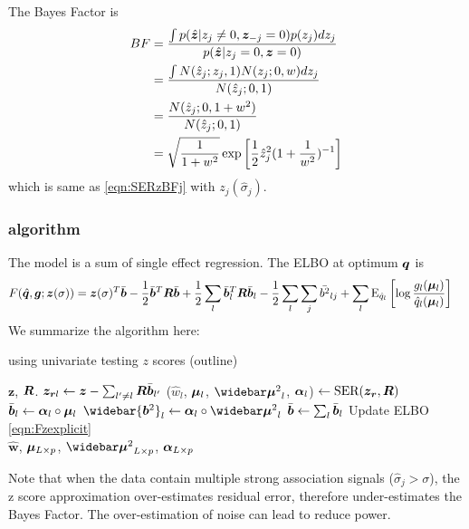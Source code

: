 The Bayes Factor is 
\begin{align}
    BF &= \frac{\int p(\hat {\bm z}|z_j\neq0, \bm z_{-j} = 0)p(z_j) d z_j }{p(\hat {\bm z}|z_j=0, \bm z = 0)} \\
    &= \frac{\int N(\hat{z}_j; z_j,1)N(z_j;0,w)d z_j}{N(\hat{z}_j; 0,1)} \\
    &= \frac{N(\hat{z}_j; 0,1+w^2)}{N(\hat{z}_j; 0,1)} \\
    &= \sqrt{\frac{1}{1+w^2}} \exp{\left[ \frac{1}{2} \hat{z}_j^2 (1+\frac{1}{w^2})^{-1} \right]}
\end{align}
which is same as \eqref{eqn:SERzBFj} with $z_j(\hat{\sigma}_j)$.

\subsubsection{\susie algorithm}
The \susie model is a sum of single effect regression. The ELBO at optimum ${\bm q}$ is
\begin{align}
    F(\hat{{\bm q}},\bm g;\bm{z}(\sigma)) &= \bm{z}(\sigma)^{T} \bar{\bm b} - \frac{1}{2}\bar{\bm b}^T \bm R \bar{\bm b} + \frac{1}{2} \sum_l \bar{\bm b}_l^T \bm R \bar{\bm b}_l - \frac{1}{2} \sum_l \sum_j \bar{b^2}_{lj} + \sum_l \text{E}_{\hat{q}_l}\left[\log\frac{g_l(\bm \mu_l)}{\hat{q}_l(\bm \mu_l)} \right] \label{eqn:Fzexplicit}
\end{align}
We summarize the algorithm here:
\begin{algorithm}[H] 
\caption{\susie using univariate testing $z$ scores (outline)} \label{alg:susiezalg}
\begin{algorithmic}[1]
\Require $\bm{z}$, $\bm R$.
\Repeat
{}
	\State $\bm{z}_{\bm r l} \gets \bm{z} - \sum_{l'\neq l} \bm R \bar{\bm b}_{l'}$ 
    \State ($\hat{w}_{l}$, $\bm \mu_l$, $\emusq_l$, $\bm \alpha_l$) $\gets \text{SER}(\bm{z}_{\bm r}, \bm R)$ 
    \State $\bar{\bm b}_l \gets \bm \alpha_l \circ \bm \mu_l$ 
    \State $\widebar{\vb^2}_l \gets \valpha_l \circ \emusq_l$ 
\EndFor
\State $\bar{\bm b} \gets \sum_l \bar{\bm b}_l$
\State Update ELBO \eqref{eqn:Fzexplicit}
 \\
\Return $\hat{\bm{w}}$, $\bm \mu_{L\times p}$, $\emusq_{L\times p}$, $\bm \alpha_{L\times p}$
\end{algorithmic}
\end{algorithm}
Note that when the data contain multiple strong association signals ($\hat{\sigma}_j > \sigma$), the z score approximation over-estimates residual error, therefore under-estimates the Bayes Factor. The over-estimation of noise can lead to reduce power.